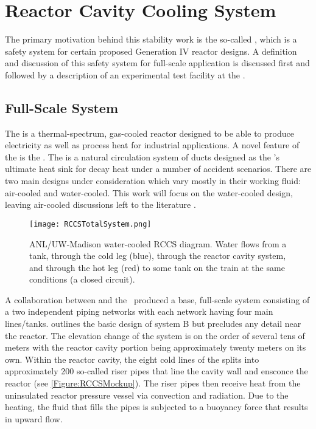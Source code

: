 \section{Reactor Cavity Cooling System}\label{Section:RCCS}
The primary motivation behind this stability work is the so-called , which is a safety system for certain proposed Generation IV reactor designs.
A definition and discussion of this safety system for full-scale application is discussed first and followed by a description of an experimental test facility at the \TheUniversity.

\subsection{Full-Scale System}
The  is a thermal-spectrum, gas-cooled reactor designed to be able to produce electricity as well as process heat for industrial applications.
A novel feature of the  is the .
The  is a natural circulation system of ducts designed as the 's ultimate heat sink for decay heat under a number of accident scenarios.
There are two main designs under consideration which vary mostly in their working fluid: air-cooled and water-cooled.
This work will focus on the water-cooled  design, leaving air-cooled discussions left to the literature \cite{bechtelnationalinc._450_1993,generalatomics_gas_1996}.


\begin{figure}%
\centering
    \caption[ANL/UW-Madison water-cooled RCCS diagram]{   ANL/UW-Madison  water-cooled RCCS diagram.  
                Water flows from a tank, through the cold leg (blue), through the reactor cavity system, and through the hot leg (red) to some tank on the train at the same conditions (a closed circuit).}%
    \label{Figure:RCCSTotalSystem}%
    \texttt{[image: RCCSTotalSystem.png]}%
\end{figure}


A collaboration between  and the \TheUniversity\ produced a base, full-scale  system consisting of a two independent piping networks with each network having four main lines/tanks.
 outlines the basic design of system B but precludes any detail near the reactor.
The elevation change of the system is on the order of several tens of meters with the reactor cavity portion being approximately twenty meters on its own.
Within the reactor cavity, the eight cold lines of the  splits into approximately 200 so-called riser pipes that line the cavity wall and ensconce the reactor (see \cref{Figure:RCCSMockup}).
The riser pipes then receive heat from the uninsulated reactor pressure vessel via convection and radiation.
Due to the heating, the fluid that fills the pipes is subjected to a buoyancy force that results in upward flow.

